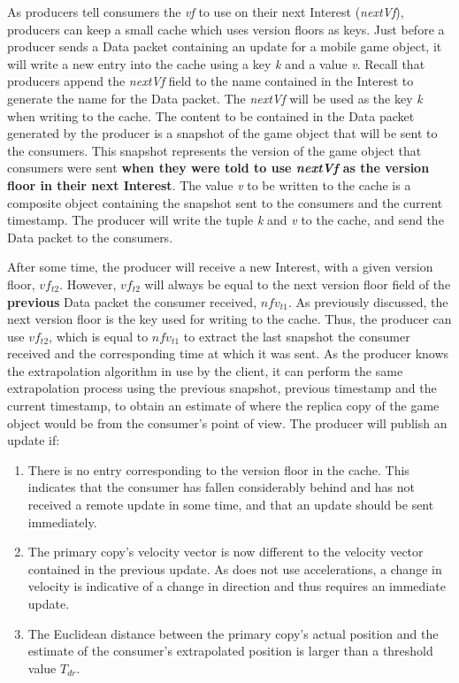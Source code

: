 As producers tell consumers the \textit{vf} to use on their next Interest (\textit{nextVf}), producers can keep a small cache which uses version floors as keys. Just before a producer sends a Data packet containing an update for a mobile game object, it will write a new entry into the cache using a key \textit{k} and a value \textit{v}. Recall that producers append the \textit{nextVf} field to the name contained in the Interest to generate the name for the Data packet. The \textit{nextVf} will be used as the key \textit{k} when writing to the cache. The content to be contained in the Data packet generated by the producer is a snapshot of the game object that will be sent to the consumers. This snapshot represents the version of the game object that consumers were sent \textbf{when they were told to use \textit{nextVf} as the version floor in their next Interest}. The value \textit{v} to be written to the cache is a composite object containing the snapshot sent to the consumers and the current timestamp. The producer will write the tuple \textit{k} and \textit{v} to the cache, and send the Data packet to the consumers. 

After some time, the producer will receive a new Interest, with a given version floor, $vf_{t2}$. However, $vf_{t2}$ will always be equal to the next version floor field of the \textbf{previous} Data packet the consumer received, $nfv_{t1}$. As previously discussed, the next version floor is the key used for writing to the cache. Thus, the producer can use $vf_{t2}$, which is equal to $nfv_{t1}$ to extract the last snapshot the consumer received and the corresponding time at which it was sent. As the producer knows the extrapolation algorithm in use by the client, it can perform the same extrapolation process using the previous snapshot, previous timestamp and the current timestamp, to obtain an estimate of where the replica copy of the game object would be from the consumer's point of view. The producer will publish an update if:

\begin{enumerate}
    \item There is no entry corresponding to the version floor in the cache. This indicates that the consumer has fallen considerably behind and has not received a remote update in some time, and that an update should be sent immediately. 
    \item The primary copy's velocity vector is now different to the velocity vector contained in the previous update. As \game{} does not use accelerations, a change in velocity is indicative of a change in direction and thus requires an immediate update.
    \item The Euclidean distance between the primary copy's actual position and the estimate of the consumer's extrapolated position is larger than a threshold value $T_{dr}$. 
\end{enumerate}

